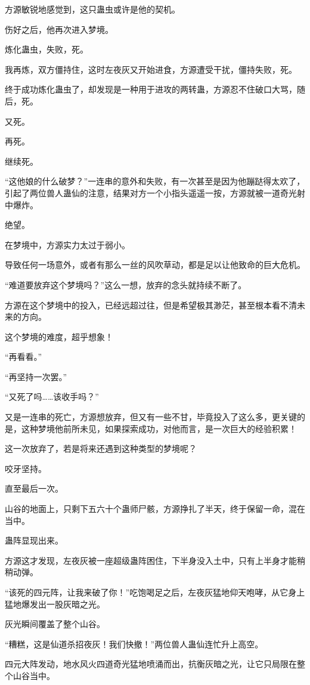 \begin{this_body}
方源敏锐地感觉到，这只蛊虫或许是他的契机。

伤好之后，他再次进入梦境。

炼化蛊虫，失败，死。

我再炼，双方僵持住，这时左夜灰又开始进食，方源遭受干扰，僵持失败，死。

终于成功炼化蛊虫了，却发现是一种用于进攻的两转蛊，方源忍不住破口大骂，随后，死。

又死。

再死。

继续死。

“这他娘的什么破梦？”一连串的意外和失败，有一次甚至是因为他蹦跶得太欢了，引起了两位兽人蛊仙的注意，结果对方一个小指头遥遥一按，方源就被一道奇光射中爆炸。

绝望。

在梦境中，方源实力太过于弱小。

导致任何一场意外，或者有那么一丝的风吹草动，都是足以让他致命的巨大危机。

“难道要放弃这个梦境吗？”这么一想，放弃的念头就持续不断了。

方源在这个梦境中的投入，已经远超过往，但是希望极其渺茫，甚至根本看不清未来的方向。

这个梦境的难度，超乎想象！

“再看看。”

“再坚持一次罢。”

“又死了吗……该收手吗？”

又是一连串的死亡，方源想放弃，但又有一些不甘，毕竟投入了这么多，更关键的是，这种梦境他前所未见，如果探索成功，对他而言，是一次巨大的经验积累！

这一次放弃了，若是将来还遇到这种类型的梦境呢？

咬牙坚持。

直至最后一次。

山谷的地面上，只剩下五六十个蛊师尸骸，方源挣扎了半天，终于保留一命，混在当中。

蛊阵显现出来。

方源这才发现，左夜灰被一座超级蛊阵困住，下半身没入土中，只有上半身才能稍稍动弹。

“该死的四元阵，让我来破了你！”吃饱喝足之后，左夜灰猛地仰天咆哮，从它身上猛地爆发出一股灰暗之光。

灰光瞬间覆盖了整个山谷。

“糟糕，这是仙道杀招夜灰！我们快撤！”两位兽人蛊仙连忙升上高空。

四元大阵发动，地水风火四道奇光猛地喷涌而出，抗衡灰暗之光，让它只局限在整个山谷当中。


\end{this_body}
